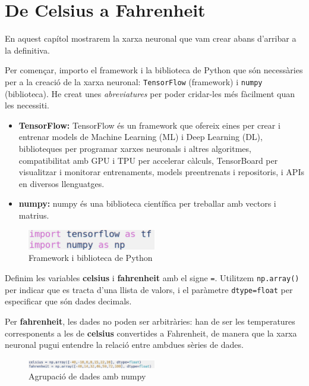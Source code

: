 \chapter{De Celsius a Fahrenheit}
En aquest capítol mostrarem la xarxa neuronal que vam crear abans d’arribar a la definitiva.

Per començar, importo el framework i la biblioteca de Python que són necessàries per a la creació de la xarxa neuronal: \texttt{TensorFlow} (framework) i \texttt{numpy} (biblioteca). He creat unes \textit{abreviatures} per poder cridar-les més fàcilment quan les necessiti.

\begin{itemize}
\item \textbf{TensorFlow:} TensorFlow és un framework que ofereix eines per crear i entrenar models de Machine Learning (ML) i Deep Learning (DL), biblioteques per programar xarxes neuronals i altres algoritmes, compatibilitat amb GPU i TPU per accelerar càlculs, TensorBoard per visualitzar i monitorar entrenaments, models preentrenats i repositoris, i APIs en diversos llenguatges.
\item \textbf{numpy:} numpy és una biblioteca científica per treballar amb vectors i matrius.
\end{itemize}

\begin{figure}[H]
\centering
\includegraphics[width=0.5\textwidth]{./figures/1.png}
\caption{Framework i biblioteca de Python}
\end{figure}

Definim les variables \textbf{celsius} i \textbf{fahrenheit} amb el signe \texttt{=}. Utilitzem \texttt{np.array()} per indicar que es tracta d’una llista de valors, i el paràmetre \texttt{dtype=float} per especificar que són dades decimals.

Per \textbf{fahrenheit}, les dades no poden ser arbitràries: han de ser les temperatures corresponents a les de \textbf{celsius} convertides a Fahrenheit, de manera que la xarxa neuronal pugui entendre la relació entre ambdues sèries de dades.

\begin{figure}[H]
\centering
\includegraphics[width=0.5\textwidth]{./figures/2.png}
\caption{Agrupació de dades amb numpy}
\end{figure}

